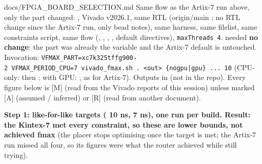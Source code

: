 \begin{relocated}{docs/FPGA_BOARD_SELECTION.md}
Same flow as the Artix-7 run above, only the part changed:
\textbf{}, Vivado v2026.1, same RTL
(origin/\allowbreak{}main ; no RTL change since the
Artix-7 run, only bead notes), same harness, same filelist, same
constraints script, same flow (, ,
, , default directives),
\texttt{maxThreads\ 4}.  needed
\textbf{no change}: the part was already the  variable
and the Artix-7 default is untouched. Invocation:
\texttt{VFMAX\_\allowbreak{}PART=\allowbreak{}xc7k325tffg900-\allowbreak{}2\ VFMAX\_\allowbreak{}PERIOD\_\allowbreak{}CPU=\allowbreak{}7\ vivado\_\allowbreak{}fmax.\allowbreak{}sh\ .\allowbreak{}\ <out>\ \{nogpu|gpu\}\ .\allowbreak{}.\allowbreak{}.\allowbreak{}\ 10}
(CPU-only:  then ; with GPU: , as for
Artix-7). Outputs in  (not in the
repo). Every figure below is {[}M{]} (read from the Vivado reports of
this session) unless marked {[}A{]} (assumed / inferred) or {[}R{]}
(read from another document).

\textbf{Step 1: like-for-like targets ( 10 ns,
 7 ns), one run per build. Result: the Kintex-7 met
every constraint, so these are lower bounds, not achieved fmax} (the
placer stops optimising once the target is met; the Artix-7 run missed
all four, so its figures were what the router achieved while still
trying).

{\footnotesize\setlength{\tabcolsep}{3pt}

}
\end{relocated}
